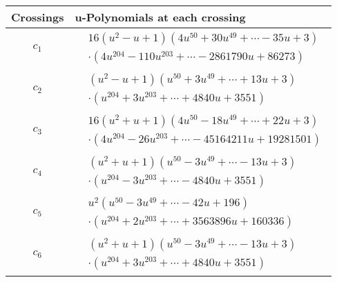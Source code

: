\documentclass[1p]{elsarticle_modified}
\theoremstyle{definition}
\begin{document}
\begin{tabular}{m{50pt}|m{274pt}}
Crossings & \hspace{64pt}u-Polynomials at each crossing \\
\hline $$\begin{aligned}c_{1}\end{aligned}$$&$\begin{aligned}
&16(u^2- u+1)(4 u^{50}+30 u^{49}+\cdots-35 u+3)\\
&\cdot(4 u^{204}-110 u^{203}+\cdots-2861790 u+86273)
\end{aligned}$\\
\hline $$\begin{aligned}c_{2}\end{aligned}$$&$\begin{aligned}
&(u^2- u+1)(u^{50}+3 u^{49}+\cdots+13 u+3)\\
&\cdot(u^{204}+3 u^{203}+\cdots+4840 u+3551)
\end{aligned}$\\
\hline $$\begin{aligned}c_{3}\end{aligned}$$&$\begin{aligned}
&16(u^2+u+1)(4 u^{50}-18 u^{49}+\cdots+22 u+3)\\
&\cdot(4 u^{204}-26 u^{203}+\cdots-45164211 u+19281501)
\end{aligned}$\\
\hline $$\begin{aligned}c_{4}\end{aligned}$$&$\begin{aligned}
&(u^2+u+1)(u^{50}-3 u^{49}+\cdots-13 u+3)\\
&\cdot(u^{204}-3 u^{203}+\cdots-4840 u+3551)
\end{aligned}$\\
\hline $$\begin{aligned}c_{5}\end{aligned}$$&$\begin{aligned}
&u^2(u^{50}-3 u^{49}+\cdots-42 u+196)\\
&\cdot(u^{204}+2 u^{203}+\cdots+3563896 u+160336)
\end{aligned}$\\
\hline $$\begin{aligned}c_{6}\end{aligned}$$&$\begin{aligned}
&(u^2+u+1)(u^{50}-3 u^{49}+\cdots-13 u+3)\\
&\cdot(u^{204}+3 u^{203}+\cdots+4840 u+3551)
\end{aligned}$\\

\end{tabular}
\end{document}
